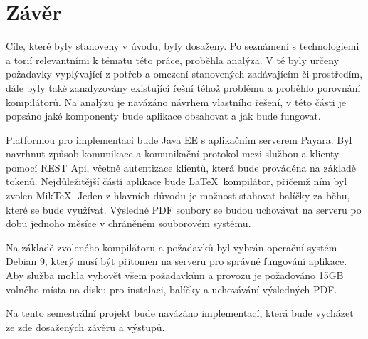 \chapter{Závěr}

Cíle, které byly stanoveny v úvodu, byly dosaženy. Po seznámení s technologiemi a torií relevantními k tématu této práce, proběhla analýza. V té byly určeny požadavky vyplývající z potřeb a omezení stanovených zadávajícím či prostředím, dále byly také zanalyzovány existující řešní téhož problému a proběhlo porovnání kompilátorů. Na analýzu je navázáno návrhem vlastního řešení, v této části je popsáno jaké komponenty bude aplikace obsahovat a jak bude fungovat. 
\par
Platformou pro implementaci bude Java EE s aplikačním serverem Payara. Byl navrhnut způsob komunikace a komunikační protokol mezi službou a klienty pomocí REST Api, včetně autentizace klientů, která bude prováděna na základě tokenů. Nejdůležitější částí aplikace bude \LaTeX\ kompilátor, přičemž ním byl zvolen MikTeX. Jeden z hlavních důvodu je možnost stahovat balíčky za běhu, které se bude využívat. Výsledné PDF soubory se budou uchovávat na serveru po dobu jednoho měsíce v chráněném souborovém systému. 
\par
Na základě zvoleného kompilátoru a požadavků byl vybrán operační systém Debian 9, který musí být přítomen na serveru pro správné fungování aplikace. Aby služba mohla vyhovět všem požadavkům a provozu je požadováno 15GB volného místa na disku pro instalaci, balíčky a uchovávání výsledných PDF.
\par
Na tento semestrální projekt bude navázáno implementací, která bude vycházet ze zde dosažených závěru a výstupů.
 
